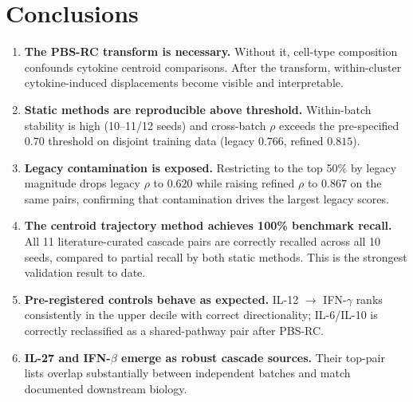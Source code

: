 \documentclass[11pt]{article}
\begin{document}
\section{Conclusions}

\begin{enumerate}[noitemsep]
  \item \textbf{The PBS-RC transform is necessary.} Without it, cell-type composition
        confounds cytokine centroid comparisons. After the transform, within-cluster
        cytokine-induced displacements become visible and interpretable.

  \item \textbf{Static methods are reproducible above threshold.} Within-batch stability
        is high (10--11/12 seeds) and cross-batch $\rho$ exceeds the pre-specified
        $0.70$ threshold on disjoint training data (legacy $0.766$, refined $0.815$).

  \item \textbf{Legacy contamination is exposed.} Restricting to the top 50\% by legacy
        magnitude drops legacy $\rho$ to $0.620$ while raising refined $\rho$ to $0.867$
        on the same pairs, confirming that contamination drives the largest legacy scores.

  \item \textbf{The centroid trajectory method achieves 100\% benchmark recall.}
        All 11 literature-curated cascade pairs are correctly recalled across all 10 seeds,
        compared to partial recall by both static methods. This is the strongest
        validation result to date.

  \item \textbf{Pre-registered controls behave as expected.} IL-12 $\to$ IFN-$\gamma$
        ranks consistently in the upper decile with correct directionality; IL-6/IL-10
        is correctly reclassified as a shared-pathway pair after PBS-RC.

  \item \textbf{IL-27 and IFN-$\beta$ emerge as robust cascade sources.} Their top-pair
        lists overlap substantially between independent batches and match documented
        downstream biology.
\end{enumerate}
\end{document}
